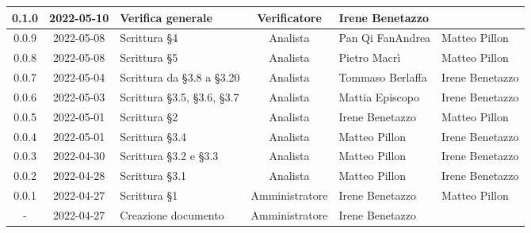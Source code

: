 \begin{center}
\begin{longtable}{ |c|c|p{8em}|c|m{5em}|m{5em}| }
	\hline
	0.1.0 & 2022-05-10 & Verifica generale & Verificatore & Irene \newline Benetazzo & \\
	\hline
    0.0.9 & 2022-05-08 & Scrittura §4 & Analista & Pan Qi Fan\newline Andrea & Matteo \newline Pillon\\
	\hline
    0.0.8 & 2022-05-08 & Scrittura §5 & Analista & Pietro \newline Macrì & Matteo \newline Pillon\\
	\hline
    0.0.7 & 2022-05-04 & Scrittura \newline da §3.8 a §3.20 & Analista & Tommaso \newline Berlaffa & Irene \newline Benetazzo\\
    \hline
    0.0.6 & 2022-05-03 & Scrittura \newline §3.5, §3.6, §3.7 & Analista & Mattia \newline Episcopo & Irene \newline Benetazzo\\
	\hline
    0.0.5 & 2022-05-01 & Scrittura §2 & Analista & Irene \newline Benetazzo & Matteo \newline Pillon\\
	\hline
    0.0.4 & 2022-05-01 & Scrittura §3.4 & Analista & Matteo \newline Pillon & Irene \newline Benetazzo\\
	\hline
    0.0.3 & 2022-04-30 & Scrittura \newline §3.2 e §3.3 & Analista & Matteo \newline Pillon & Irene \newline Benetazzo\\
	\hline
    0.0.2 & 2022-04-28 & Scrittura §3.1 & Analista & Matteo \newline Pillon & Irene \newline Benetazzo\\
	\hline
	0.0.1 & 2022-04-27 & Scrittura §1 & Amministratore & Irene \newline Benetazzo & Matteo \newline Pillon\\
	\hline
	- & 2022-04-27 & Creazione \newline documento & Amministratore & Irene \newline Benetazzo & \\
	\hline
	\end{longtable}
	\end{center}
	\newpage
